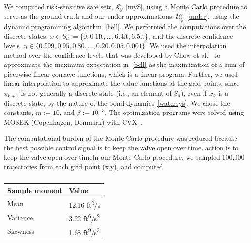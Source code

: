 \documentclass[letterpaper, 10 pt, conference]{ieeeconf}  %
\begin{document}
We computed risk-sensitive safe sets, $\mathcal{S}_y^r$~\eqref{myS}, using a Monte Carlo procedure to serve as the ground truth 
and our under-approximations, $\mathcal{U}_y^r$~\eqref{under}, using the dynamic programming algorithm~\eqref{bell}.
We performed the computations over the discrete states, $x \in S_d := \{0, 0.1\text{ft}, \dots, 6.4\text{ft}, 6.5\text{ft}\}$,
and the discrete confidence levels, $y \in \{0.999, 0.95, 0.80, \dots, 0.20, 0.05, 0.001\}$.
We used the interpolation method over the confidence levels that was developed by Chow et al.~\cite{chow2015risk} 
to approximate the maximum expectation in~\eqref{bell}
as the maximization of a sum of piecewise linear concave functions, which is a linear program. 
Further, we used linear interpolation to approximate the value functions at the grid points, since $x_{k+1}$ is not generally a discrete state (i.e., an element of $S_d$), even if $x_k$ is a discrete state,
by the nature of the pond dynamics~\eqref{watersys}. We chose the constants, $m := 10$, and $\beta := 10^{-3}$.
The optimization programs were solved using MOSEK (Copenhagen, Denmark) with CVX~\cite{grant2008cvx}.

The computational burden of the Monte Carlo procedure was reduced because the best possible control signal is to keep the valve open over time.
 action is to keep
the valve open over timeIn our Monte Carlo procedure, we sampled 100,000 trajectories from each grid point (x,y), and computed 


  


\begin{table}
\begin{center}
\caption{}
\begin{tabular}{| p{2cm} | p{2cm} |}
\hline
\bf{Sample moment} & \bf{Value}  \\ \hline
Mean & 12.16 ft\textsuperscript{3}/s \\ \hline
Variance & 3.22 ft\textsuperscript{6}/s\textsuperscript{2} \\ \hline
Skewness & 1.68 ft\textsuperscript{9}/s\textsuperscript{3} \\ \hline
\end{tabular}
\begin{flushleft} \end{flushleft}
\label{stats}
\end{center}
\end{table}
\end{document}

